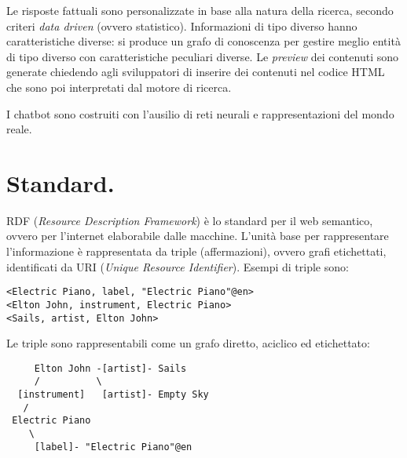 \documentclass[11pt]{article}
\begin{document}
\begin{multicols}{2}
Le risposte fattuali sono personalizzate in base alla natura della ricerca, secondo criteri \textit{data driven} (ovvero statistico).
Informazioni di tipo diverso hanno caratteristiche diverse: si produce un grafo di conoscenza per gestire meglio entità di tipo diverso con caratteristiche peculiari diverse.
Le \textit{preview} dei contenuti sono generate chiedendo agli sviluppatori di inserire dei contenuti nel codice HTML che sono poi interpretati dal motore di ricerca.

I chatbot sono costruiti con l'ausilio di reti neurali e rappresentazioni del mondo reale.


\section{Standard.}
RDF (\textit{Resource Description Framework}) è lo standard per il web semantico, ovvero per l'internet elaborabile dalle macchine.
L'unità base per rappresentare l'informazione è rappresentata da triple (affermazioni), ovvero grafi etichettati, identificati da URI (\textit{Unique Resource Identifier}).
Esempi di triple sono:
\end{multicols}
\begin{verbatim}
<Electric Piano, label, "Electric Piano"@en>
<Elton John, instrument, Electric Piano>
<Sails, artist, Elton John>
\end{verbatim}
Le triple sono rappresentabili come un grafo diretto, aciclico ed etichettato:
\begin{verbatim}
     Elton John -[artist]- Sails
     /          \
  [instrument]   [artist]- Empty Sky
   /
 Electric Piano 
    \
     [label]- "Electric Piano"@en
\end{verbatim}
\end{document}
